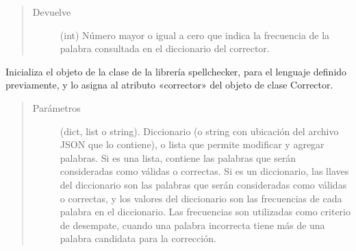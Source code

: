 \documentclass[letterpaper,10pt,openany,spanish]{sphinxmanual}
\begin{document}
\begin{fulllineitems}
\begin{fulllineitems}
\begin{quote}
\begin{description}
\item[{Devuelve}] \leavevmode
(int) Número mayor o igual a cero que indica la frecuencia de la palabra             consultada en el diccionario del corrector.

\end{description}\end{quote}

\end{fulllineitems}


\begin{fulllineitems}
\label{\detokenize{funciones/correccion:correccion.Corrector.iniciar_corrector}}
Inicializa el objeto de la clase  de la librería spellchecker,         para el lenguaje definido previamente, y lo asigna al atributo «corrector» del         objeto de clase Corrector.
\begin{quote}\begin{description}
\item[{Parámetros}] \leavevmode
{} \textendash{} (dict, list o string). Diccionario (o string con ubicación del             archivo JSON que lo contiene), o lista que permite modificar y agregar palabras.             Si es una lista, contiene las palabras que serán consideradas como válidas o correctas.             Si es un diccionario, las llaves del diccionario son las palabras que serán consideradas
como válidas o correctas, y los valores del diccionario son las frecuencias de cada palabra             en el diccionario. Las frecuencias son utilizadas como criterio de desempate, cuando una             palabra incorrecta tiene más de una palabra candidata para la corrección.

\end{description}\end{quote}

\end{fulllineitems}



\end{fulllineitems}
\end{document}
